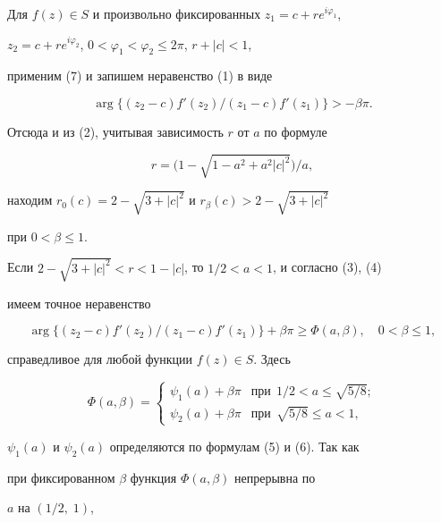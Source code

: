 \begin{pf} 


Для $f(z)\in S$ и произвольно фиксированных $z_1=c+r e^{i\varphi_1}$, 


$z_2=c+r e^{i\varphi_2}$, $0<\varphi_1<\varphi_2\le2\pi$, $r+|c|<1$, 


применим (7) и запишем неравенство (1) в виде 


$$ 


\arg\{(z_2-c)f'(z_2)/(z_1-c)f'(z_1)\}>-\beta\pi. 


$$ 


Отсюда и из (2), учитывая зависимость $r$ от $a$ по формуле


\begin{equation} 


r=\big(1-\sqrt{1-a^2+a^2|c|^2}\big)/a, 


\end{equation} 


находим $r_0(c)=2-\sqrt{3+|c|^2}$ и $r_\beta(c)>2-\sqrt{3+|c|^2}$ 


при $0<\beta\le1$. 


 


Если $2-\sqrt{3+|c|^2}<r<1-|c|$, то $1/2<a<1$, и согласно (3), (4) 


имеем точное неравенство 


$$ 


\arg\{(z_2-c)f'(z_2)/(z_1-c)f'(z_1)\}+\beta\pi 


\ge\Phi(a,\beta),\quad 0<\beta\le1, 


$$ 


справедливое для любой функции $f(z)\in S$. Здесь 


$$ 


\Phi(a,\beta)= 


\begin{cases} 


\psi_1(a)+\beta\pi & \text{при}\ \ 1/2<a\le\sqrt{5/8};\\ 


\psi_2(a)+\beta\pi & \text{при}\ \ \sqrt{5/8}\le a<1, 


\end{cases} 


$$ 


$\psi_1(a)$ и $\psi_2(a)$ определяются по формулам (5) и (6). Так как 


при фиксированном $\beta$ функция $\Phi(a,\beta)$ непрерывна по 


$a$ на $(1/2,\;1)$, 



\end{pf}
